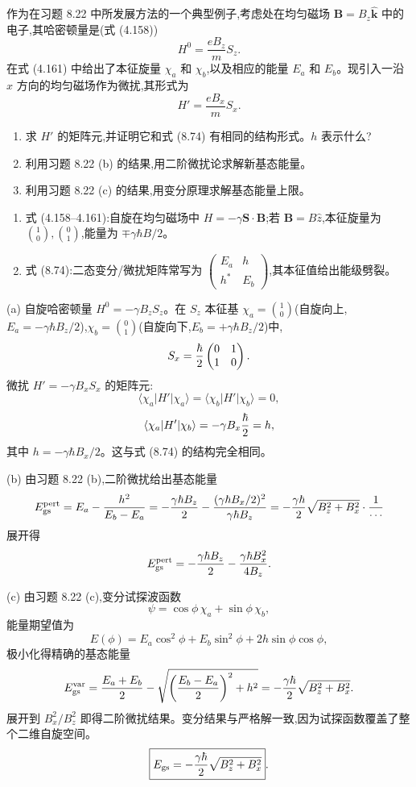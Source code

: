 \begin{question}
作为在习题 8.22 中所发展方法的一个典型例子,考虑处在均匀磁场 $\mathbf B=B_z\hat{\mathbf k}$ 中的电子,其哈密顿量是(式 (4.158))
\[
H^0=\frac{eB_z}{m}S_z.
\]
在式 (4.161) 中给出了本征旋量 $\chi_a$ 和 $\chi_b$,以及相应的能量 $E_a$ 和 $E_b$。现引入一沿 $x$ 方向的均匀磁场作为微扰,其形式为
\[
H'=\frac{eB_x}{m}S_x.
\]
\begin{enumerate}
\item 求 $H'$ 的矩阵元,并证明它和式 (8.74) 有相同的结构形式。$h$ 表示什么?
\item 利用习题 8.22 (b) 的结果,用二阶微扰论求解新基态能量。
\item 利用习题 8.22 (c) 的结果,用变分原理求解基态能量上限。
\end{enumerate}

\par\smallskip
{}
\begin{enumerate}[leftmargin=2.2em,itemsep=0.12em,topsep=0.12em,parsep=0pt]
\item 式 (4.158--4.161):自旋在均匀磁场中 $H=-\gamma\mathbf S\cdot\mathbf B$;若 $\mathbf B=B\hat z$,本征旋量为 $\binom10,\binom01$,能量为 $\mp\gamma\hbar B/2$。
\item 式 (8.74):二态变分/微扰矩阵常写为 $\begin{pmatrix}E_a&h\\h^*&E_b\end{pmatrix}$,其本征值给出能级劈裂。
\end{enumerate}

\begin{solution}
(a) 自旋哈密顿量 $H^0=-\gamma B_zS_z$。在 $S_z$ 本征基 $\chi_a=\binom10$(自旋向上,$E_a=-\gamma\hbar B_z/2$),$\chi_b=\binom01$(自旋向下,$E_b=+\gamma\hbar B_z/2$)中,
\[
S_x={\hbar\over2}\begin{pmatrix}0&1\\1&0\end{pmatrix}.
\]
微扰 $H'=-\gamma B_xS_x$ 的矩阵元:
\[
\langle\chi_a|H'|\chi_a\rangle=\langle\chi_b|H'|\chi_b\rangle=0,
\]
\[
\langle\chi_a|H'|\chi_b\rangle=-\gamma B_x{\hbar\over2}=h,
\]
其中 $h=-\gamma\hbar B_x/2$。这与式 (8.74) 的结构完全相同。

(b) 由习题 8.22 (b),二阶微扰给出基态能量
\[
E_{\rm gs}^{\rm pert}=E_a-{h^2\over E_b-E_a}
=-{\gamma\hbar B_z\over2}-{(\gamma\hbar B_x/2)^2\over\gamma\hbar B_z}
=-{\gamma\hbar\over2}\sqrt{B_z^2+B_x^2}\cdot{1\over\cdots}
\]
展开得
\[
E_{\rm gs}^{\rm pert}=-{\gamma\hbar B_z\over2}-{\gamma\hbar B_x^2\over4B_z}.
\]

(c) 由习题 8.22 (c),变分试探波函数
\[
\psi=\cos\phi\,\chi_a+\sin\phi\,\chi_b,
\]
能量期望值为
\[
E(\phi)=E_a\cos^2\phi+E_b\sin^2\phi+2h\sin\phi\cos\phi,
\]
极小化得精确的基态能量
\[
E_{\rm gs}^{\rm var}={E_a+E_b\over2}-\sqrt{\left({E_b-E_a\over2}\right)^2+h^2}
=-{\gamma\hbar\over2}\sqrt{B_z^2+B_x^2}.
\]
展开到 $B_x^2/B_z^2$ 即得二阶微扰结果。变分结果与严格解一致,因为试探函数覆盖了整个二维自旋空间。
\[
\boxed{E_{\rm gs}=-{\gamma\hbar\over2}\sqrt{B_z^2+B_x^2}}.
\]
\end{solution}
\end{question}

